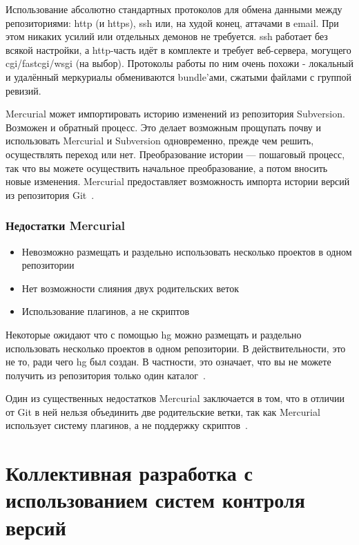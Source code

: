 \documentclass{../industrial-development}
\begin{document}
Использование абсолютно стандартных протоколов для обмена данными между репозиториями: http (и https), ssh или, на худой конец, аттачами в email.
При этом никаких усилий или отдельных демонов не требуется. ssh работает без всякой настройки, а http-часть идёт в комплекте и требует веб-сервера, могущего cgi/fastcgi/wsgi (на выбор). Протоколы работы по ним очень похожи - локальный и удалённый меркуриалы обмениваются bundle’ами, сжатыми файлами с группой ревизий.

Mercurial может импортировать историю изменений из репозитория Subversion. Возможен и обратный процесс. Это делает возможным прощупать почву и использовать Mercurial и Subversion одновременно, прежде чем решить, осуществлять переход или нет. Преобразование истории — пошаговый процесс, так что вы можете осуществить начальное преобразование, а потом вносить новые изменения.
Mercurial предоставляет возможность импорта истории версий из репозитория Git~\cite[с.~7--9]{MercurialOReilly}.

\begin{frame} \frametitle{Недостатки Mercurial}
  
  \begin{itemize}
  \item Невозможно размещать и раздельно использовать несколько проектов в одном репозитории
  \item Нет возможности слияния двух родительских веток
  \item Использование плагинов, а не скриптов
  \end{itemize}
\end{frame}

\lecturenotes

Некоторые ожидают что с помощью hg можно размещать и раздельно использовать несколько проектов в одном репозитории. В действительности, это не то, ради чего hg был создан. В частности, это означает, что вы не можете получить из репозитория только один каталог~\cite{MercurialWiki}.

Один из существенных недостатков Mercurial заключается в том, что в отличии от Git в ней нельзя объединить две родительские ветки, так как Mercurial использует систему плагинов, а не поддержку скриптов~\cite{MercurialTD}.

\section{Коллективная разработка с использованием систем контроля версий}
\end{document}
